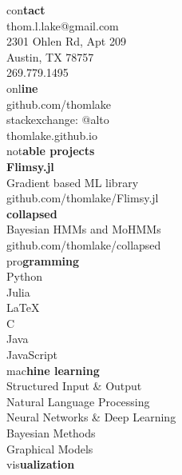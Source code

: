\documentclass[10pt]{article}
\newcommand{\heada}[1]{\textcolor{shadecolor}{\LARGE{#1}}}
\newcommand{\headb}[1]{\textcolor{shadecolor}{\textbf{\LARGE{#1}}}}
\begin{document}
\vspace{2cm}

\begin{paracol}{2}
\begin{leftcolumn}
    \begin{flushright}
        \heada{con}\headb{tact}\\[0.5cm]
        thom.l.lake@gmail.com\\
        2301 Ohlen Rd, Apt 209\\
        Austin, TX 78757\\
        269.779.1495\\[0.5cm]
        \heada{onl}\headb{ine}\\[0.5cm]
        github.com/thomlake\\
        stackexchange: @alto\\
        thomlake.github.io\\[0.5cm]
        \heada{not}\headb{able projects}\\[0.5cm]
        \textbf{Flimsy.jl} \\
        Gradient based ML library\\
        github.com/thomlake/Flimsy.jl\\[0.25cm]
        \textbf{collapsed} \\
        Bayesian HMMs and MoHMMs\\
        github.com/thomlake/collapsed\\[0.5cm]
        \heada{pro}\headb{gramming}\\[0.5cm]
        Python\\[0.0cm]
        Julia\\
        \LaTeX\\
        C\\
        Java\\
        JavaScript\\[0.5cm]
        \heada{mac}\headb{hine learning}\\[0.5cm]
        Structured Input \& Output\\
        Natural Language Processing\\
        Neural Networks \& Deep Learning\\
        Bayesian Methods\\
        Graphical Models\\[0.5cm]
        \heada{vis}\headb{ualization}\\[0.5cm]

\end{flushright}
\end{leftcolumn}
\end{paracol}
\end{document}
